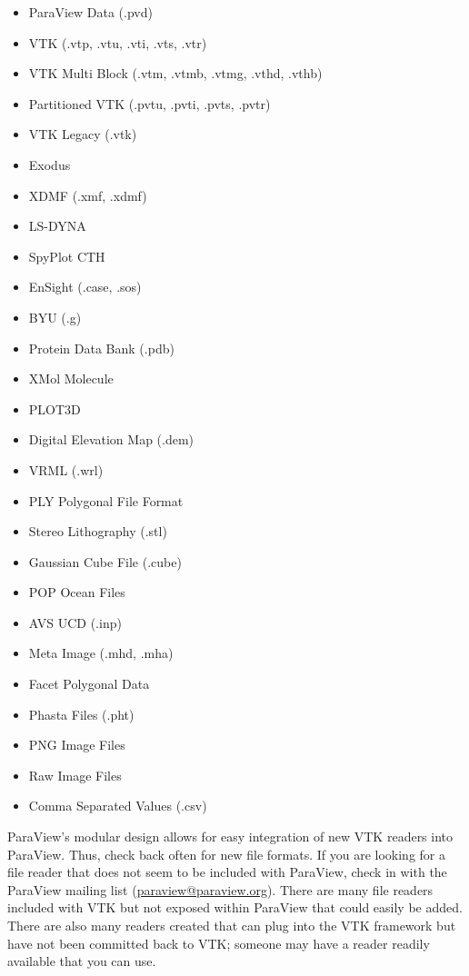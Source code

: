 \begin{multicols}{2}
  \begin{itemize}
  \item ParaView Data (.pvd)
  \item VTK (.vtp, .vtu, .vti, .vts, .vtr)
  \item VTK Multi Block (.vtm, .vtmb, .vtmg, .vthd, .vthb)
  \item Partitioned VTK (.pvtu, .pvti, .pvts, .pvtr)
  \item VTK Legacy (.vtk)
  \item Exodus
  \item XDMF (.xmf, .xdmf)
  \item LS-DYNA
  \item SpyPlot CTH
  \item EnSight (.case, .sos)
  \item BYU (.g)
  \item Protein Data Bank (.pdb)
  \item XMol Molecule
  \item PLOT3D
  \item Digital Elevation Map (.dem)
  \item VRML (.wrl)
  \item PLY Polygonal File Format
  \item Stereo Lithography (.stl)
  \item Gaussian Cube File (.cube)
  \item POP Ocean Files
  \item AVS UCD (.inp)
  \item Meta Image (.mhd, .mha)
  \item Facet Polygonal Data
  \item Phasta Files (.pht)
  \item PNG Image Files
  \item Raw Image Files
  \item Comma Separated Values (.csv)
  \end{itemize}
\end{multicols}

ParaView’s modular design allows for easy integration of new VTK readers
into ParaView.  Thus, check back often for new file formats.  If you are
looking for a file reader that does not seem to be included with ParaView,
check in with the ParaView mailing list
(\href{mailto:paraview@paraview.org}{paraview@paraview.org}).  There are
many file readers included with VTK but not exposed within ParaView that
could easily be added.  There are also many readers created that can plug
into the VTK framework but have not been committed back to VTK; someone may
have a reader readily available that you can use.

